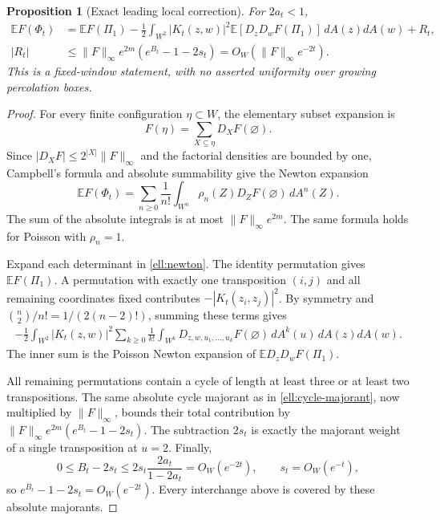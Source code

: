 \documentclass[11pt,a4paper]{article}
\newtheorem{proposition}[theorem]{Proposition}
\theoremstyle{definition}
\theoremstyle{remark}
\numberwithin{equation}{section}
\begin{document}
\begin{proposition}[Exact leading local correction]
\label{ell:local-perturbation}
For $2a_t<1$,
\begin{align}
 \mathbb EF(\Phi_t)
 &=\mathbb EF(\Pi_1)
 -\frac12\int_{W^2}|K_t(z,w)|^2
             \mathbb E[D_zD_wF(\Pi_1)]\,dA(z)dA(w)
 +R_t,\label{ell:perturbation}\\
 |R_t|&\le \|F\|_\infty e^{2m}
                  (e^{B_t}-1-2s_t)
       =O_W(\|F\|_\infty e^{-2t}).\label{ell:remainder}
\end{align}
This is a fixed-window statement, with no asserted uniformity
over growing percolation boxes.
\end{proposition}

\begin{proof}
For every finite configuration $\eta\subset W$, the elementary
subset expansion is
\[
 F(\eta)=\sum_{X\subseteq\eta}D_XF(\varnothing).
\]
Since $|D_XF|\le2^{|X|}\|F\|_\infty$ and the factorial
densities are bounded by one, Campbell's formula and absolute
summability give the Newton expansion
\begin{equation}\label{ell:newton}
 \mathbb EF(\Phi_t)=\sum_{n\ge0}\frac1{n!}
      \int_{W^n}\rho_n(Z)D_ZF(\varnothing)\,dA^n(Z).
\end{equation}
The sum of the absolute integrals is at most
$\|F\|_\infty e^{2m}$.  The same formula holds for Poisson
with $\rho_n=1$.

Expand each determinant in \eqref{ell:newton}.  The identity
permutation gives $\mathbb EF(\Pi_1)$.  A permutation with
exactly one transposition $(i,j)$ and all remaining coordinates
fixed contributes $-|K_t(z_i,z_j)|^2$.  By symmetry and
$\binom n2/n!=1/(2(n-2)!)$, summing these terms gives
\begin{align*}
 -\frac12\int_{W^2}|K_t(z,w)|^2
  \sum_{k\ge0}\frac1{k!}\int_{W^k}
      D_{z,w,u_1,\ldots,u_k}F(\varnothing)\,dA^k(u)
                  \,dA(z)dA(w).
\end{align*}
The inner sum is the Poisson Newton expansion of
$\mathbb E D_zD_wF(\Pi_1)$.

All remaining permutations contain a cycle of length at least
three or at least two transpositions.  The same absolute cycle
majorant as in \eqref{ell:cycle-majorant}, now multiplied by
$\|F\|_\infty$, bounds their total contribution by
$\|F\|_\infty e^{2m}(e^{B_t}-1-2s_t)$.
The subtraction $2s_t$ is exactly the majorant weight of a single
transposition at $u=2$.  Finally,
\[
 0\le B_t-2s_t
 \le 2s_t\frac{2a_t}{1-2a_t}=O_W(e^{-2t}),
 \qquad s_t=O_W(e^{-t}),
\]
so $e^{B_t}-1-2s_t=O_W(e^{-2t})$.  Every interchange above
is covered by these absolute majorants.
\end{proof}
\end{document}
